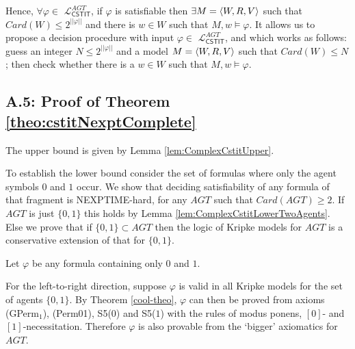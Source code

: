 \documentclass{article}
\renewcommand{\phi}{\varphi}
\newcommand{\card}[1]{\mathit{Card}(#1)}           \newcommand{\ext}[1]{|#1|}
\newcommand{\lngth}[1]{|\!|#1|\!|}
\newcommand{\cstit}[1]{[{#1}]}           \newcommand{\poscstit}[1]{\langle {#1} \rangle}    \newcommand{\dstit}[2]{[{#1}\ \mathit{dstit}\! :{#2}]}
\newcommand{\agtset}{\ensuremath{\mathit{AGT}}}
\newcommand{\LCSTIT}{$\mathcal{L}_{\mathsf{CSTIT}}^\agtset$}
\begin{document}
Hence, $\forall \phi \in $ \LCSTIT,
if $\phi$ is satisfiable then
$\exists M = \langle W,R,V \rangle$ such that $\card{W} \leq 2^{\lngth{\phi}}$ and
there is $w\in W$ such that $M,w\models\phi$.
It allows us to propose a decision procedure with input $\phi \in $ \LCSTIT,
and which works as follows:
guess an integer $N \leq 2^{\lngth{\phi}}$ and a model $M = \langle W,R,V \rangle$
such that $\card{W} \leq N$;
then check whether there is a $w \in W$ such that $M,w \models \phi$.




\subsection*{A.5: Proof of Theorem \ref{theo:cstitNexptComplete}}

The upper bound is given by Lemma \ref{lem:ComplexCstitUpper}.

To establish the lower bound consider 
the set of formulas where only the agent symbols $0$ and $1$ occur.
We show that deciding satisfiability of any formula of that fragment
is NEXPTIME-hard, for any $\agtset$ such that $\card{\agtset} \geq 2$.
If $\agtset $ is just $\{0,1\} $ this holds
by Lemma \ref{lem:ComplexCstitLowerTwoAgents}.
Else we prove that if $\{0,1\} \subset \agtset $ then
the logic of Kripke models for $\agtset$ is a conservative extension of
that for $\{0,1\}$.


Let $\phi$ be any formula containing only $0$ and $1$.

For the left-to-right direction, suppose $\phi$ is valid in all Kripke models
for the set of agents $\{0,1\} $.
By Theorem \ref{cool-theo}, $\phi $ can then be proved from
axioms (GPerm$_1$), (Perm01), S5($0$) and S5($1$) with
the rules of modus ponens, $\cstit{0}$- and  $\cstit{1}$-necessitation.
Therefore $\phi$ is also provable from the `bigger' axiomatics for $\agtset$.
\end{document}
